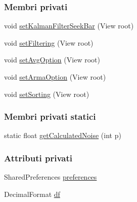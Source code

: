 \subsubsection*{Membri privati}
\begin{DoxyCompactItemize}
\item 
void \hyperlink{classit_1_1unibo_1_1torsello_1_1bluetoothpositioning_1_1fragment_1_1SettingsFragment_a84057f1633708ec85de5968ed9e7f032_a84057f1633708ec85de5968ed9e7f032}{set\+Kalman\+Filter\+Seek\+Bar} (View root)
\item 
void \hyperlink{classit_1_1unibo_1_1torsello_1_1bluetoothpositioning_1_1fragment_1_1SettingsFragment_a0d7b911602439aaf2a9ee4d5f9e41088_a0d7b911602439aaf2a9ee4d5f9e41088}{set\+Filtering} (View root)
\item 
void \hyperlink{classit_1_1unibo_1_1torsello_1_1bluetoothpositioning_1_1fragment_1_1SettingsFragment_a0f26c84f3a3dfffabfed1db04303b8b0_a0f26c84f3a3dfffabfed1db04303b8b0}{set\+Avg\+Option} (View root)
\item 
void \hyperlink{classit_1_1unibo_1_1torsello_1_1bluetoothpositioning_1_1fragment_1_1SettingsFragment_a093ab503fb5dc6ddb859b128b614d902_a093ab503fb5dc6ddb859b128b614d902}{set\+Arma\+Option} (View root)
\item 
void \hyperlink{classit_1_1unibo_1_1torsello_1_1bluetoothpositioning_1_1fragment_1_1SettingsFragment_ae29f0b3d6fc60f1ceeab5dcc530166c1_ae29f0b3d6fc60f1ceeab5dcc530166c1}{set\+Sorting} (View root)
\end{DoxyCompactItemize}
\subsubsection*{Membri privati statici}
\begin{DoxyCompactItemize}
\item 
static float \hyperlink{classit_1_1unibo_1_1torsello_1_1bluetoothpositioning_1_1fragment_1_1SettingsFragment_a595d859602f34ca81957a0578c1602a6_a595d859602f34ca81957a0578c1602a6}{get\+Calculated\+Noise} (int p)
\end{DoxyCompactItemize}
\subsubsection*{Attributi privati}
\begin{DoxyCompactItemize}
\item 
Shared\+Preferences \hyperlink{classit_1_1unibo_1_1torsello_1_1bluetoothpositioning_1_1fragment_1_1SettingsFragment_a52480c4d5d81ca59fe4a98ae3c623ea4_a52480c4d5d81ca59fe4a98ae3c623ea4}{preferences}
\item 
Decimal\+Format \hyperlink{classit_1_1unibo_1_1torsello_1_1bluetoothpositioning_1_1fragment_1_1SettingsFragment_af6b80a700dc80c39a56d001b68a47694_af6b80a700dc80c39a56d001b68a47694}{df}
\end{DoxyCompactItemize}
